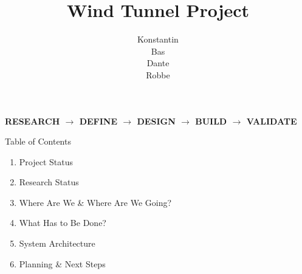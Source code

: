 \documentclass[aspectratio=169,10pt]{beamer}
\title[Wind Tunnel Project]{Wind Tunnel Project}
\author[Project Leader: R. van Eekelen]{Konstantin\\[2pt]Bas\\[2pt]Dante\\[2pt]Robbe}
\institute[]{Aerospace Engineering Minor\\[3pt]Avans University of Applied Sciences}
\date{}
\begin{document}
\begin{frame}
  \titlepage
  \vspace{-1cm}
  \begin{center}
    \color{structure.fg}\small\bfseries
    RESEARCH $\longrightarrow$ DEFINE $\longrightarrow$ DESIGN
    $\longrightarrow$ BUILD $\longrightarrow$ VALIDATE
  \end{center}
\end{frame}

\begin{frame}{Table of Contents}
  \begin{enumerate}\setlength{\itemsep}{1em}
    \item Project Status
    \item Research Status
    \item Where Are We \& Where Are We Going?
    \item What Has to Be Done?
    \item System Architecture
    \item Planning \& Next Steps
  \end{enumerate}
\end{frame}
\end{document}
